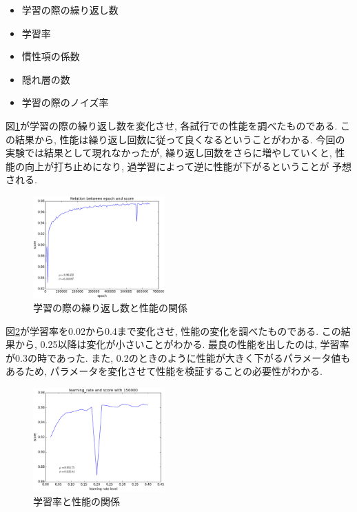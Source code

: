 \documentclass[10pt,a4paper,twocolumn]{jarticle}
\begin{document}
\begin{itemize}
  \item 学習の際の繰り返し数
  \item 学習率
  \item 慣性項の係数
  \item 隠れ層の数
  \item 学習の際のノイズ率
\end{itemize}

図\ref{fig:epoch-test}が学習の際の繰り返し数を変化させ,
各試行での性能を調べたものである. 
この結果から, 性能は繰り返し回数に従って良くなるということがわかる. 
今回の実験では結果として現れなかったが,
繰り返し回数をさらに増やしていくと, 
性能の向上が打ち止めになり, 過学習によって逆に性能が下がるということが
予想される. 
\begin{figure}[htbp]
  \centering
  \includegraphics[width=0.45\textwidth]{assets/img/epoch_test_mnist.eps}
  \caption{学習の際の繰り返し数と性能の関係}
  \label{fig:epoch-test}
\end{figure}

図\ref{fig:learning-rate-test}が学習率を0.02から0.4まで変化させ, 
性能の変化を調べたものである. 
この結果から, 0.25以降は変化が小さいことがわかる. 
最良の性能を出したのは, 学習率が0.3の時であった. 
また, 0.2のときのように性能が大きく下がるパラメータ値もあるため, 
パラメータを変化させて性能を検証することの必要性がわかる. 
\begin{figure}[htbp]
  \centering
  \includegraphics[width=0.45\textwidth]{assets/img/learning_rate_test_mnist.eps}
  \caption{学習率と性能の関係}
  \label{fig:learning-rate-test}
\end{figure}
\end{document}
